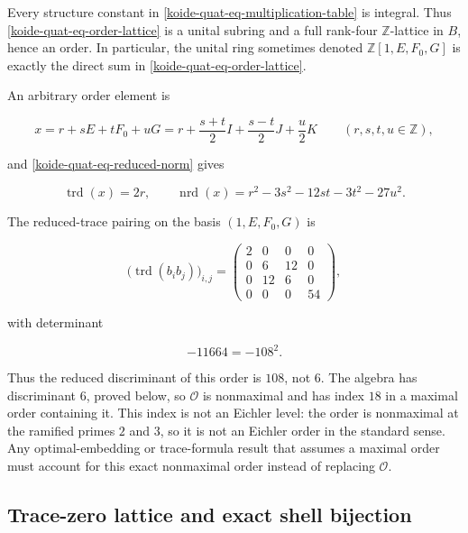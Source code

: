 Every structure constant in \eqref{koide-quat-eq-multiplication-table} is integral. Thus \eqref{koide-quat-eq-order-lattice} is a unital subring and a full rank-four \(\mathbb Z\)-lattice in \(B\), hence an order. In particular, the unital ring sometimes denoted \(\mathbb Z[1,E,F_0,G]\) is exactly the direct sum in \eqref{koide-quat-eq-order-lattice}.

An arbitrary order element is

\begin{equation}\label{koide-quat-eq-order-coordinates}
 x=r+sE+tF_0+uG
  =r+\frac{s+t}{2}I+\frac{s-t}{2}J+\frac u2K
 \qquad(r,s,t,u\in\mathbb Z),
\end{equation}

and \eqref{koide-quat-eq-reduced-norm} gives

\begin{equation}\label{koide-quat-eq-order-trace-norm}
 \operatorname{trd}(x)=2r,
 \qquad
 \operatorname{nrd}(x)
 =r^2-3s^2-12st-3t^2-27u^2.
\end{equation}

The reduced-trace pairing on the basis \((1,E,F_0,G)\) is

\[
 \bigl(\operatorname{trd}(b_ib_j)\bigr)_{i,j}
 =
 \begin{pmatrix}
  2&0&0&0\\
  0&6&12&0\\
  0&12&6&0\\
  0&0&0&54
 \end{pmatrix},
\]

with determinant

\begin{equation}\label{koide-quat-eq-order-discriminant-determinant}
 -11664=-108^2.
\end{equation}

Thus the reduced discriminant of this order is \(108\), not \(6\). The algebra has discriminant \(6\), proved below, so \(\mathcal O\) is nonmaximal and has index \(18\) in a maximal order containing it. This index is not an Eichler level: the order is nonmaximal at the ramified primes \(2\) and \(3\), so it is not an Eichler order in the standard sense. Any optimal-embedding or trace-formula result that assumes a maximal order must account for this exact nonmaximal order instead of replacing \(\mathcal O\).

\subsection{Trace-zero lattice and exact shell bijection}\label{koide-quat-trace-zero-lattice-and-exact-shell-bijection}

